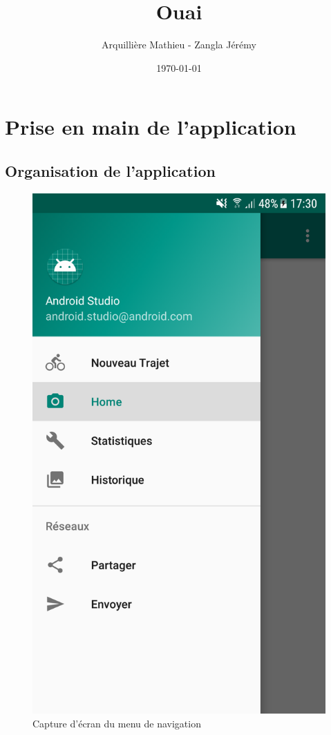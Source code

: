 \documentclass{article}
\title{Ouai}
\author{Arquillière Mathieu - Zangla Jérémy}
\date{\today}
\begin{document}
\begin{titlepage}
  \maketitle
\end{titlepage}

\tableofcontents
\listoffigures
\newpage

\section{Prise en main de l'application}
\subsection{Organisation de l'application}
\begin{figure}
  \vspace{-50pt}
  \label{Menu de navigation}
  \centering
  \includegraphics[scale=0.13]{images/navigation-menu.png}
  \caption{Capture d'écran du menu de navigation}
\end{figure}
\end{document}
